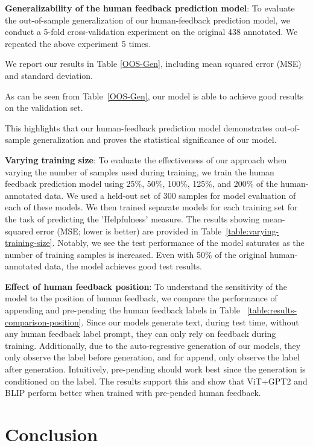 \documentclass[11pt]{article}
\begin{document}
\textbf{Generalizability of the human feedback prediction model}: To evaluate the out-of-sample generalization of our human-feedback prediction model, we conduct a 5-fold cross-validation experiment on the original 438 annotated.
We repeated the above experiment 5 times. 

We report our results in Table \ref{OOS-Gen}, including mean squared error (MSE) and standard deviation. 

As can be seen from Table~\ref{OOS-Gen}, our model is able to achieve good results on the validation set. 

This highlights that our human-feedback prediction model demonstrates out-of-sample generalization and proves the statistical significance of our model.

\textbf{Varying training size}:
To evaluate the effectiveness of our approach when varying the number of samples used during training, we train the human feedback prediction model using 25\%, 50\%, 100\%, 125\%, and 200\% of the human-annotated data.
We used a held-out set of 300 samples for model evaluation of each of these models.
We then trained separate models for each training set for the task of predicting the 'Helpfulness' measure. 
The results showing mean-squared error (MSE; lower is better) are provided in Table~\ref{table:varying-training-size}.
Notably, we see the test performance of the model saturates as the number of training samples is increased. Even with 50\% of the original human-annotated data, the model achieves good test results.  


\textbf{Effect of human feedback position}: 
To understand the sensitivity of the model to the position of human feedback, we compare the performance of appending and pre-pending the human feedback labels in Table ~\ref{table:results-comparison-position}. Since our models generate text, during test time, without any human feedback label prompt, they can only rely on feedback during training. Additionally, due to the auto-regressive generation of our models, they only observe the label before generation, and for append, only observe the label after generation. Intuitively, pre-pending should work best since the generation is conditioned on the label. The results support this and show that ViT+GPT2 and BLIP perform better when trained with pre-pended human feedback. 




\section{Conclusion} \label{sec:conc}
\end{document}
